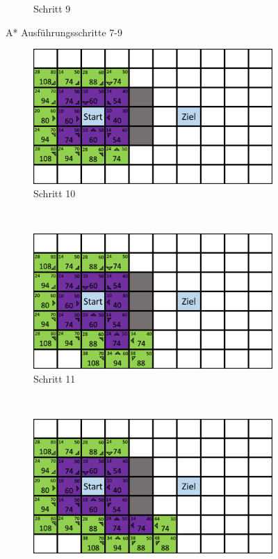\begin{figure}[H]
\begin{subfigure}[b]{0.3\textwidth}
        \caption{Schritt 9}
        \label{fig:aStartStep9}
    \end{subfigure}
    \caption{A* Ausführungsschritte 7-9}\label{fig:aStarStep7_9}
\end{figure}

\begin{figure}[H]
    \centering
    \begin{subfigure}[b]{0.3\textwidth}
        \includegraphics[width=\textwidth]{assets/aStarStep9.png}
        \caption{Schritt 10}
        \label{fig:aStartStep10}
    \end{subfigure}
    ~
    \begin{subfigure}[b]{0.3\textwidth}
        \includegraphics[width=\textwidth]{assets/aStarStep10.png}
        \caption{Schritt 11}
        \label{fig:aStartStep11}
    \end{subfigure}
    ~
    \begin{subfigure}[b]{0.3\textwidth}
        \includegraphics[width=\textwidth]{assets/aStarStep11.png}

\end{subfigure}
\end{figure}

